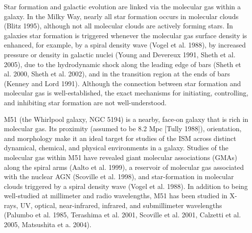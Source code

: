 \documentclass[manuscript]{aastex}
\begin{document}
Star formation and galactic evolution are linked via the molecular gas within a galaxy.  In the Milky Way, nearly all star formation occurs in molecular clouds (Blitz 1995), although not all molecular clouds are actively forming stars.  In galaxies star formation is triggered whenever the molecular gas surface density is enhanced, for example, by a spiral density wave (Vogel et al. 1988), by increased pressure or density in galactic nuclei (Young and Devereux 1991, Sheth et al. 2005),  due to the hydrodynamic shock along the leading edge of bars (Sheth et al. 2000, Sheth et al. 2002), and in the transition region at the ends of bars (Kenney and Lord 1991).  Although the connection between star formation and molecular gas is well-established, the exact mechanisms for initiating, controlling, and inhibiting star formation are not well-understood.

M51 (the Whirlpool galaxy, NGC 5194) is a nearby, face-on galaxy that is rich in molecular gas.  Its proximity (assumed to be 8.2 Mpc [Tully 1988]), orientation, and morphology make it an ideal target for studies of the ISM across distinct dynamical, chemical, and physical environments in a galaxy.  Studies of the molecular gas within M51 have revealed giant molecular associations (GMAs) along the spiral arms (Aalto et al. 1999), a reservoir of molecular gas associated with the nuclear AGN (Scoville et al. 1998), and star-formation in molecular clouds triggered by a spiral density wave (Vogel et al. 1988).  In addition to being well-studied at millimeter and radio wavelengths, M51 has been studied in X-rays, UV, optical, near-infrared, infrared,  and submillimeter wavelengths (Palumbo et al. 1985,  Terashima et al. 2001, Scoville et al. 2001, Calzetti et al. 2005, Matsushita et a. 2004).  

\end{document}
